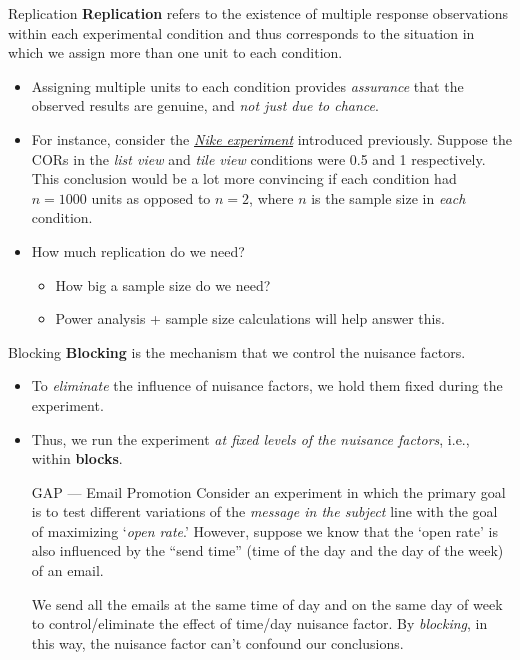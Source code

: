 \begin{Definition}{Replication}{}
      \textbf{Replication} refers to the existence of multiple response observations
      within each experimental condition and thus corresponds to the situation in which
      we assign more than one unit to each condition.
\end{Definition}
\begin{itemize}
      \item Assigning multiple units to each condition provides \emph{assurance} that the
            observed results are genuine, and \emph{not just due to chance}.
      \item For instance, consider the \emph{\hyperref[ex:nike_ex]{Nike experiment}}
            introduced previously. Suppose the CORs in the \emph{list view} and
            \emph{tile view} conditions were 0.5 and 1 respectively. This conclusion would be
            a lot more convincing if each condition had $ n=1000 $ units as opposed to $ n=2 $,
            where $ n $ is the sample size in \emph{each} condition.
      \item How much replication do we need?
            \begin{itemize}
                  \item How big a sample size do we need?
                  \item Power analysis + sample size calculations will help answer this.
            \end{itemize}
\end{itemize}
\begin{Definition}{Blocking}{}
      \textbf{Blocking} is the mechanism that we control the nuisance factors.
\end{Definition}
\begin{itemize}
      \item To \emph{eliminate} the influence of nuisance factors, we hold them fixed during
            the experiment.
      \item Thus, we run the experiment \emph{at fixed levels of the nuisance factors}, i.e.,
            within \textbf{blocks}.

            \begin{Example}{GAP --- Email Promotion}{}
                  Consider an experiment in which the primary goal is to
                  test different variations of the \emph{message in the subject} line with the goal of
                  maximizing `\emph{open rate}.' However, suppose we know that the
                  `open rate' is also influenced by the ``send time'' (time of the day and the day of the week)
                  of an email.

                  \vspace{2mm}

                  We send all the emails at the same time of day and on the same day of week
                  to control/eliminate the effect of time/day nuisance factor. By \emph{blocking},
                  in this way, the nuisance factor can't confound our conclusions.
            \end{Example}
\end{itemize}

